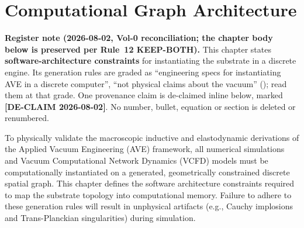 \chapter{Computational Graph Architecture}
\label{ch:computational_graph}

\noindent\textbf{Register note (2026-08-02, Vol-0 reconciliation; the chapter body below is preserved per Rule~12 KEEP-BOTH).} This chapter states \textbf{software-architecture constraints} for instantiating the substrate in a discrete engine. Its generation rules are graded as ``engineering specs for instantiating AVE in a discrete computer'', ``not physical claims about the vacuum'' (); read them at that grade. One provenance claim is de-claimed inline below, marked \textbf{[DE-CLAIM 2026-08-02]}. No number, bullet, equation or section is deleted or renumbered.

To physically validate the macroscopic inductive and elastodynamic derivations of the Applied Vacuum Engineering (AVE) framework, all numerical simulations and Vacuum Computational Network Dynamics (VCFD) models must be computationally instantiated on a generated, geometrically constrained discrete spatial graph. This chapter defines the software architecture constraints required to map the substrate topology into computational memory. Failure to adhere to these generation rules will result in unphysical artifacts (e.g., Cauchy implosions and Trans-Planckian singularities) during simulation.

